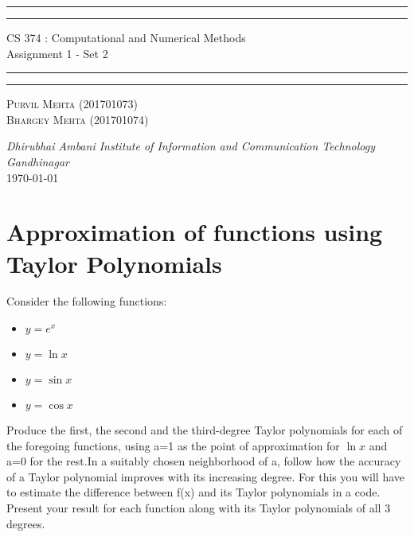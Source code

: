 \documentclass{article}
\begin{document}
\begin{titlepage}
	\centering 
	\scshape
	\vspace*{\baselineskip}
	\rule{\textwidth}{1.6pt}\vspace*{-\baselineskip}\vspace*{2pt}
	\rule{\textwidth}{0.4pt} 
	\vspace{0.75\baselineskip}
	
	{\Large CS 374 : Computational and Numerical Methods \\\vspace{0.75\baselineskip} Assignment 1 - Set 2}
	\vspace{0.75\baselineskip}
	
	\rule{\textwidth}{0.4pt}\vspace*{-\baselineskip}\vspace{3.2pt} 
	\rule{\textwidth}{1.6pt}
	
	\vspace{2\baselineskip}  
	
	\vspace*{3\baselineskip}
	
	\vspace{0.5\baselineskip} %
	
	{\scshape\large Purvil Mehta (201701073) \\ Bhargey Mehta (201701074) \\} 
	
	\vspace{1\baselineskip} 
	
	\textit{Dhirubhai Ambani Institute of Information and Communication Technology \\ Gandhinagar\\} 
	\vspace*{2\baselineskip}
	\today


\end{titlepage}

\newpage
\tableofcontents
\newpage
\section{Approximation of functions using Taylor Polynomials}
\par Consider the following functions:
\begin{itemize}
    \item $y = e^x$
    \item $y = \ln{x}$
    \item $y = \sin{x}$
    \item $y = \cos{x}$
\end{itemize}
Produce the first, the second and the third-degree Taylor polynomials for each of the foregoing functions, using a=1 as the point of approximation for $\ln{x}$ and a=0 for the rest.In a suitably chosen neighborhood of a, follow how the accuracy of a Taylor polynomial improves with its increasing degree. For this you will have to estimate the difference between f(x) and its Taylor polynomials in a code. Present your result  for each function along with its Taylor polynomials of all 3 degrees.
\end{document}
